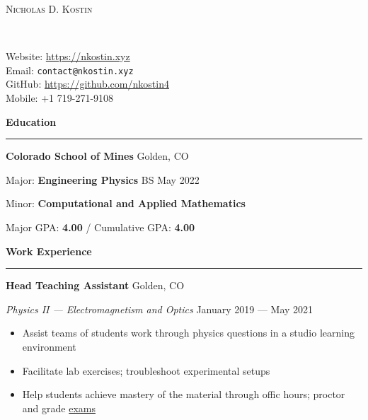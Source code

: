 \documentclass{article}
\begin{document}
\begin{minipage}{0.63\textwidth}
\begin{flushleft}
\textsc{\Huge{Nicholas D. Kostin}}
\end{flushleft}
\end{minipage}
~
\begin{minipage}{0.35\textwidth}
\begin{flushright}
\parbox[c]{\textwidth}{Website: \url{https://nkostin.xyz} \\ Email: \texttt{contact@nkostin.xyz} \\ GitHub: \url{https://github.com/nkostin4} \\ Mobile: +1 719-271-9108}
\end{flushright}
\end{minipage}

\vspace{1em}

\textbf{\Large{Education}} \\[-0.5em]
\rule{\textwidth}{1pt}

\hspace{1.5em} \textbf{Colorado School of Mines} \hfill Golden, CO

\hspace{1.5em} Major: \textbf{Engineering Physics} \hfill BS May 2022

\hspace{1.5em} Minor: \textbf{Computational and Applied Mathematics}

\vspace{1em}

\hspace{1.5em} Major GPA: \textbf{4.00} / Cumulative GPA: \textbf{4.00}

\vspace{1em}

\textbf{\Large{Work Experience}} \\[-0.5em]
\rule{\textwidth}{1pt}

\hspace{1.5em} \textbf{Head Teaching Assistant} \hfill Golden, CO

\hspace{1.5em} \textit{Physics II --- Electromagnetism and Optics} \hfill January 2019 --- May 2021

\vspace{-0.5em}

\begin{itemize}[leftmargin=6.0em]
\setlength{\itemsep}{0em}
\item Assist teams of students work through physics questions in a studio learning environment
\item Facilitate lab exercises; troubleshoot experimental setups
\item Help students achieve mastery of the material through offic hours; proctor and grade \href{https://lukesmith.xyz}{exams}
\end{itemize}
\end{document}
